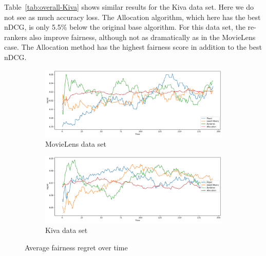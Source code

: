 Table~\ref{tab:overall-Kiva} shows similar results for the Kiva data set. Here we do not see as much accuracy loss. The Allocation algorithm, which here has the best nDCG, is only 5.5\% below the original base algorithm. For this data set, the re-rankers also improve fairness, although not as dramatically as in the MovieLens case. The Allocation method has the highest fairness score in addition to the best nDCG.

\begin{figure}[tbh]
\setlength\tabcolsep{0pt}
    \begin{subfigure}{1.0\textwidth}
    \centering
    \includegraphics[width=4.5in]{imgs/dynfair/ml_avg_regret_overtime_sep20.png}
    \caption{MovieLens data set}
    \label{fig:timeseries-local-regret-ML}
    \end{subfigure}
    \begin{subfigure}{1.0\textwidth}
    \centering
      \includegraphics[width=4.5in]{imgs/dynfair/kiva_avg_regret_overtime_sep20.png}
    \caption{Kiva data set}
    \label{fig:timeseries-local-regret-Kiva}
    \end{subfigure}
    \caption{Average fairness regret over time}
    \label{fig:local-regret}
\end{figure}

